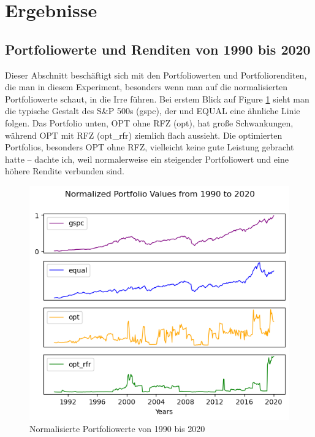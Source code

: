 \documentclass[12pt]{article}
\begin{document}
    \section{Ergebnisse}
    
        \subsection{Portfoliowerte und Renditen von 1990 bis 2020}

            Dieser Abschnitt beschäftigt sich mit den Portfoliowerten und Portfoliorenditen, 
            die man in diesem Experiment, besonders wenn man auf die normalisierten Portfoliowerte schaut, 
            in die Irre führen. Bei erstem Blick auf Figure \ref{n-portfoliowerte-fig} sieht man die typische Gestalt des S\&P 500s (gspc), 
            der und EQUAL eine ähnliche Linie folgen. Das Portfolio unten, OPT ohne RFZ (opt), 
            hat große Schwankungen, während OPT mit RFZ (opt\_rfr) ziemlich flach aussieht. Die optimierten Portfolios, 
            besonders OPT ohne RFZ, vielleicht keine gute Leistung gebracht hatte -- dachte ich, 
            weil normalerweise ein steigender Portfoliowert und eine höhere Rendite verbunden sind. 


            \begin{figure}[ht]
            
                \begin{center}

                    \includegraphics[scale=0.8]{normalized-portfolio-1990-2020.png}
                    \caption{Normalisierte Portfoliowerte von 1990 bis 2020}
                    \label{n-portfoliowerte-fig}
        
                \end{center}
                
            \end{figure}
\end{document}
